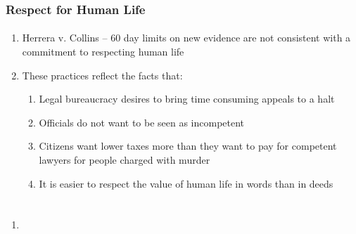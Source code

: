 \documentclass{beamer}
\begin{document}
\begin{frame}
    \frametitle{Respect for Human Life}
    \framesubtitle{}
\begin{enumerate}
\item Herrera v. Collins -- 60 day limits on new evidence are not 
consistent with a commitment to respecting human life
\item These practices reflect the facts that:
\begin{enumerate}
\item Legal bureaucracy desires to bring time consuming appeals to a 
halt
\item Officials do not want to be seen as incompetent
\item Citizens want lower taxes more than they want to pay for competent 
lawyers for people charged with murder
\item It is easier to respect the value of human life in words than in 
deeds

\end{enumerate}
\end{enumerate}



\end{frame}


\section{}

\begin{frame}
    \frametitle{}
    \framesubtitle{}
\begin{enumerate}
\item 


\end{enumerate}



\end{frame}


\section{}

\begin{frame}
    \frametitle{}
    \framesubtitle{}



\end{frame}


\section{}
\end{document}
